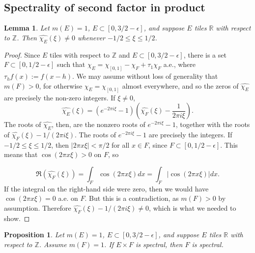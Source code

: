 \documentclass{amsart}
\newtheorem{proposition}[theorem]{Proposition}
\newtheorem{lemma}[theorem]{Lemma}
\begin{document}
\subsection{Spectrality of second factor in product}

\begin{lemma}
    Let $m(E)=1$, $E\subset[0,3/2-\epsilon]$, and suppose $E$ tiles $\mathbb R$ with respect to $\mathbb{Z}$. Then $\hat{\chi_E}(\xi)\neq 0$ whenever $-1/2\leq\xi\leq 1/2$.
\end{lemma}

\begin{proof}
    Since $E$ tiles with respect to $\mathbb{Z}$ and $E\subset [0, 3/2-\epsilon]$, there is a set $F\subset [0,1/2-\epsilon]$ such that $\chi_E=\chi_{[0,1]}-\chi_F+\tau_1\chi_F$ a.e., where $\tau_hf(x):=f(x-h)$. We may assume without loss of generality that $m(F)> 0$, for otherwise $\chi_E=\chi_{[0,1]}$ almost everywhere, and so the zeros of $\hat{\chi_E}$ are precisely the non-zero integers. If $\xi\neq 0$,
    $$\hat{\chi_E}(\xi)=(e^{-2\pi i\xi}-1)\left(\hat{\chi_F}(\xi)-\frac{1}{2\pi i\xi}\right).$$
    The roots of $\hat{\chi_E}$, then, are the nonzero roots of $e^{-2\pi i\xi}-1$, together with the roots of $\hat{\chi_F}(\xi)-1/(2\pi i\xi)$. The roots of $e^{-2\pi i\xi}-1$ are precisely the integers. If $-1/2\leq \xi\leq 1/2$, then $|2\pi x\xi|<\pi/2$ for all $x\in F$, since $F\subset [0,1/2-\epsilon]$. This means that $\cos(2\pi x\xi)>0$ on $F$, so
    
    $$\Re(\hat{\chi_F}(\xi))=\int_F\cos(2\pi x\xi)dx=\int_F\left|\cos(2\pi x\xi)\right|dx.$$
    If the integral on the right-hand side were zero, then we would have $\cos(2\pi x\xi)=0$ a.e. on $F$. But this is a contradiction, as $m(F)>0$ by assumption. Therefore $\hat{\chi_F}(\xi)-1/(2\pi i\xi)\neq 0$, which is what we needed to show. \end{proof}

    \begin{proposition}
    Let $m(E)=1$, $E\subset[0,3/2-\epsilon]$, and suppose $E$ tiles $\mathbb{R}$ with respect to $\mathbb{Z}$. Assume $m(F)=1$. If $E\times F$ is spectral, then $F$ is spectral.
\end{proposition}
\end{document}
